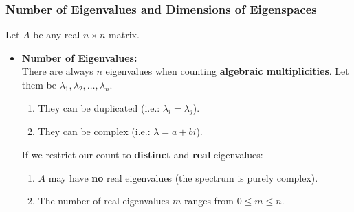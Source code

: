 \documentclass[11pt]{article}
\newcommand{\mymat}[1]{#1}
\begin{document}
    \subsubsection{Number of Eigenvalues and Dimensions of Eigenspaces}
    Let $\mymat{A}$ be any real $n \times n$ matrix.
    \begin{itemize}
        \item \textbf{Number of Eigenvalues:} \vspace{1ex} \\
            There are always $n$ eigenvalues when counting \textbf{algebraic multiplicities}. Let them be $\lambda_1, \lambda_2, \dots, \lambda_n$.
            \begin{enumerate}
                \item They can be duplicated (i.e.: $\lambda_i = \lambda_j$).
                \item They can be complex (i.e.: $\lambda = a + bi$).
            \end{enumerate} \vspace{1ex}
            If we restrict our count to \textbf{distinct} and \textbf{real} eigenvalues:
            \begin{enumerate}
                \item $\mymat{A}$ may have \textbf{no} real eigenvalues (the spectrum is purely complex).
                \item The number of real eigenvalues $m$ ranges from $0 \le m \le n$.
            \end{enumerate}


\end{itemize}
\end{document}
